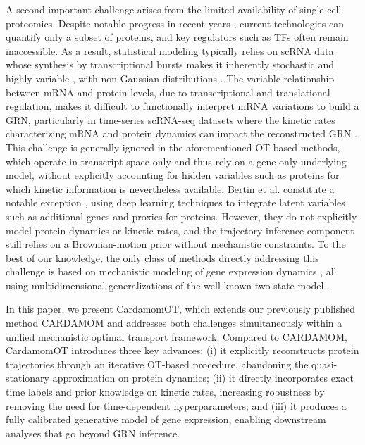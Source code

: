 \documentclass[a4paper, 11pt]{article}
\theoremstyle{plain}
\theoremstyle{remark}
\begin{document}
A second important challenge arises from the limited availability of single-cell proteomics. Despite notable progress in recent years \cite{ahmad2023review}, current technologies can quantify only a subset of proteins, and key regulators such as TFs often remain inaccessible. As a result, statistical modeling typically relies on scRNA data whose synthesis by transcriptional bursts makes it inherently stochastic and highly variable \cite{zong2010lysogen, ochiai2014stochastic}, with non-Gaussian distributions \cite{herbach2018modelisation, Mar_2019}. The variable relationship between mRNA and protein levels, due to transcriptional and translational regulation, makes it difficult to functionally interpret mRNA variations to build a GRN, particularly in time-series scRNA-seq datasets where the kinetic rates characterizing mRNA and protein dynamics can impact the reconstructed GRN \cite{ventre2023one}. This challenge is generally ignored in the aforementioned OT-based methods, which operate in transcript space only and thus rely on a gene-only underlying model, without explicitly accounting for hidden variables such as proteins for which kinetic information is nevertheless available. Bertin et al. constitute a notable exception \cite{bertin2025scalable}, using deep learning techniques to integrate latent variables such as additional genes and proxies for proteins. However, they do not explicitly model protein dynamics or kinetic rates, and the trajectory inference component still relies on a Brownian-motion prior without mechanistic constraints. To the best of our knowledge, the only class of methods directly addressing this challenge is based on mechanistic modeling of gene expression dynamics \cite{herbachinferring2017, bonnaffoux2019wasabi, ventre2022reverse, ventre2023one, fang2025trajectory}, all using multidimensional generalizations of the well-known two-state model \cite{peccoud1995markovian}.

In this paper, we present CardamomOT, which extends our previously published method CARDAMOM \cite{ventre2023one} and addresses both challenges simultaneously within a unified mechanistic optimal transport framework. Compared to CARDAMOM, CardamomOT introduces three key advances: (i) it explicitly reconstructs protein trajectories through an iterative OT-based procedure, abandoning the quasi-stationary approximation on protein dynamics; (ii) it directly incorporates exact time labels and prior knowledge on kinetic rates, increasing robustness by removing the need for time-dependent hyperparameters; and (iii) it produces a fully calibrated generative model of gene expression, enabling downstream analyses that go beyond GRN inference.
\end{document}
